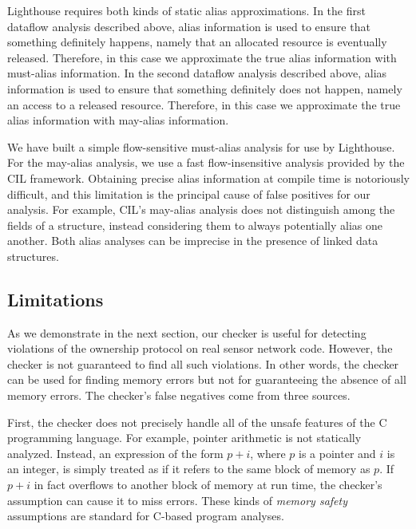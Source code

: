 Lighthouse requires both kinds of static alias approximations.  
%
In the first dataflow analysis described above, alias information is used to
ensure that something definitely happens, namely that an allocated resource
is eventually released.  
%
Therefore, in this case we approximate the true alias information with
must-alias information.  
%
In the second dataflow analysis described above, alias information is used
to ensure that something definitely does not happen, namely an access to a
released resource.  
%
Therefore, in this case we approximate the true alias information with
may-alias information.



We have built a simple flow-sensitive must-alias analysis for use by
Lighthouse.  
%
For the may-alias analysis, we use a fast flow-insensitive analysis provided
by the CIL framework.  
%
Obtaining precise alias information at compile time is notoriously
difficult, and this limitation is the principal cause of false positives for
our analysis.
%
For example, CIL's may-alias analysis does not distinguish among the fields
of a structure, instead considering them to always potentially alias one
another.  
%
Both alias analyses can be imprecise in the presence of linked data
structures.



\subsection{Limitations}



As we demonstrate in the next section, our checker is useful for detecting
violations of the ownership protocol on real sensor network code.  
%
However, the checker is not guaranteed to find all such violations.  
%
In other words, the checker can be used for finding memory errors but not
for guaranteeing the absence of all memory errors.  
%
The checker's false negatives come from three sources.



First, the checker does not precisely handle all of the unsafe features of
the C programming language.  
%
For example, pointer arithmetic is not statically analyzed.  
%
Instead, an expression of the form $p+i$, where $p$ is a pointer and $i$ is
an integer, is simply treated as if it refers to the same block of memory as
$p$.  
%
If $p+i$ in fact overflows to another block of memory at run time, the
checker's assumption can cause it to miss errors.  
%
These kinds of {\em memory safety} assumptions are standard for C-based
program analyses.



